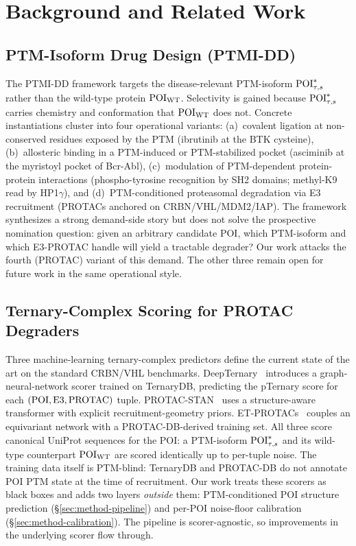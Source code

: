 \section{Background and Related Work}
\label{sec:related}

\subsection{PTM-Isoform Drug Design (PTMI-DD)}
\label{sec:related-ptmidd}

The PTMI-DD framework targets the disease-relevant PTM-isoform $\mathrm{POI}^{*}_{\tau,s}$ rather than the wild-type protein $\mathrm{POI}_{\mathrm{WT}}$. Selectivity is gained because $\mathrm{POI}^{*}_{\tau,s}$ carries chemistry and conformation that $\mathrm{POI}_{\mathrm{WT}}$ does not. Concrete instantiations cluster into four operational variants: (a)~covalent ligation at non-conserved residues exposed by the PTM (ibrutinib at the BTK cysteine), (b)~allosteric binding in a PTM-induced or PTM-stabilized pocket (asciminib at the myristoyl pocket of Bcr-Abl), (c)~modulation of PTM-dependent protein-protein interactions (phospho-tyrosine recognition by SH2 domains; methyl-K9 read by HP1$\gamma$), and (d)~PTM-conditioned proteasomal degradation via E3 recruitment (PROTACs anchored on CRBN/VHL/MDM2/IAP). The framework synthesizes a strong demand-side story but does not solve the prospective nomination question: given an arbitrary candidate POI, which PTM-isoform and which E3-PROTAC handle will yield a tractable degrader? Our work attacks the fourth (PROTAC) variant of this demand. The other three remain open for future work in the same operational style.

\subsection{Ternary-Complex Scoring for PROTAC Degraders}
\label{sec:related-ternary}

Three machine-learning ternary-complex predictors define the current state of the art on the standard CRBN/VHL benchmarks. DeepTernary~\cite{deepternary-2025} introduces a graph-neural-network scorer trained on TernaryDB, predicting the pTernary score for each $(\mathrm{POI},\mathrm{E3},\mathrm{PROTAC})$ tuple. PROTAC-STAN~\cite{protac-stan-2025} uses a structure-aware transformer with explicit recruitment-geometry priors. ET-PROTACs~\cite{et-protacs-2024} couples an equivariant network with a PROTAC-DB-derived training set. All three score canonical UniProt sequences for the POI: a PTM-isoform $\mathrm{POI}^{*}_{\tau,s}$ and its wild-type counterpart $\mathrm{POI}_{\mathrm{WT}}$ are scored identically up to per-tuple noise. The training data itself is PTM-blind: TernaryDB and PROTAC-DB do not annotate POI PTM state at the time of recruitment. Our work treats these scorers as black boxes and adds two layers \emph{outside} them: PTM-conditioned POI structure prediction (\S\ref{sec:method-pipeline}) and per-POI noise-floor calibration (\S\ref{sec:method-calibration}). The pipeline is scorer-agnostic, so improvements in the underlying scorer flow through.

